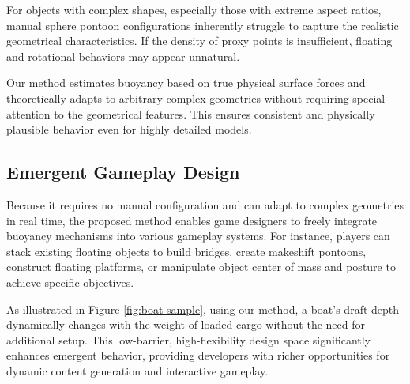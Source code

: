 For objects with complex shapes, especially those with extreme aspect ratios, manual sphere pontoon configurations inherently struggle to capture the realistic geometrical characteristics. If the density of proxy points is insufficient, floating and rotational behaviors may appear unnatural.

Our method estimates buoyancy based on true physical surface forces and theoretically adapts to arbitrary complex geometries without requiring special attention to the geometrical features. This ensures consistent and physically plausible behavior even for highly detailed models.

\subsection{Emergent Gameplay Design}

Because it requires no manual configuration and can adapt to complex geometries in real time, the proposed method enables game designers to freely integrate buoyancy mechanisms into various gameplay systems. For instance, players can stack existing floating objects to build bridges, create makeshift pontoons, construct floating platforms, or manipulate object center of mass and posture to achieve specific objectives.

As illustrated in Figure \ref{fig:boat-sample}, using our method, a boat's draft depth dynamically changes with the weight of loaded cargo without the need for additional setup. This low-barrier, high-flexibility design space significantly enhances emergent behavior, providing developers with richer opportunities for dynamic content generation and interactive gameplay.

